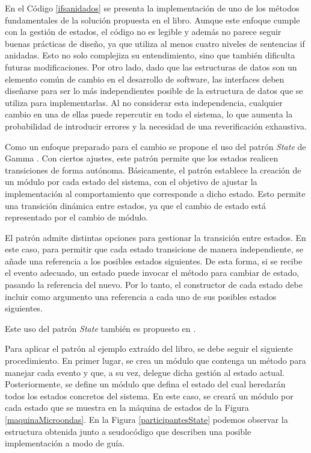En el Código \ref{ifsanidados} se presenta la implementación de uno de los métodos fundamentales de la solución propuesta en el libro. Aunque este enfoque cumple con la gestión de estados, el código no es legible y además no parece seguir buenas prácticas de diseño, ya que utiliza al menos cuatro niveles de sentencias if anidadas. Esto no solo complejiza su entendimiento, sino que también dificulta futuras modificaciones. Por otro lado, dado que las estructuras de datos son un elemento común de cambio en el desarrollo de software, las interfaces deben diseñarse para ser lo más independientes posible de la estructura de datos que se utiliza para implementarlas. Al no considerar esta independencia, cualquier cambio en una de ellas puede repercutir en todo el sistema, lo que aumenta la probabilidad de introducir errores y la necesidad de una reverificación exhaustiva.

Como un enfoque preparado para el cambio se propone el uso del patrón \textit{State} de Gamma \cite{anexoState}. Con ciertos ajustes, este patrón permite que los estados realicen transiciones de forma autónoma. Básicamente, el patrón establece la creación de un módulo por cada estado del sistema, con el objetivo de ajustar la implementación al comportamiento que corresponde a dicho estado. Esto permite una transición dinámica entre estados, ya que el cambio de estado está representado por el cambio de módulo.

El patrón admite distintas opciones para gestionar la transición entre estados. En este caso, para permitir que cada estado transicione de manera independiente, se añade una referencia a los posibles estados siguientes. De esta forma, si se recibe el evento adecuado, un estado puede invocar el método para cambiar de estado, pasando la referencia del nuevo. Por lo tanto, el constructor de cada estado debe incluir como argumento una referencia a cada uno de sus posibles estados siguientes.

Este uso del patrón \textit{State} también es propuesto en \cite[\textit{Chapter 10 : Finite State Machine Patterns Part III: New Patterns as Design Components}]{douglass}.

Para aplicar el patrón al ejemplo extraído del libro\cite{douglass}, se debe seguir el siguiente procedimiento. En primer lugar, se crea un módulo que contenga un método para manejar cada evento y que, a su vez, delegue dicha gestión al estado actual. Posteriormente, se define un módulo que defina el estado del cual heredarán todos los estados concretos del sistema. En este caso, se creará un módulo por cada estado que se muestra en la máquina de estados de la Figura \ref{maquinaMicroondas}. En la Figura \ref{participantesState} podemos observar la estructura obtenida junto a seudocódigo que describen una posible implementación a modo de guía.

